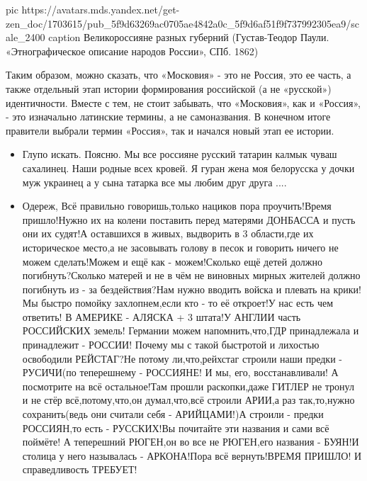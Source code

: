 
\ifcmt
  pic https://avatars.mds.yandex.net/get-zen_doc/1703615/pub_5f9d63269ac0705ae4842a0c_5f9d6af51f9f737992305ea9/scale_2400
  caption Великороссияне разных губерний (Густав-Теодор Паули. «Этнографическое описание народов России», СПб. 1862)
\fi

Таким образом, можно сказать, что «Московия» - это не Россия, это ее часть, а
также отдельный этап истории формирования российской (а не «русской»)
идентичности. Вместе с тем, не стоит забывать, что «Московия», как и «Россия»,
- это изначально латинские термины, а не самоназвания. В конечном итоге
правители выбрали термин «Россия», так и начался новый этап ее истории.

\begin{itemize}
\item {}

Глупо искать. Поясню. Мы все россияне русский татарин калмык чуваш сахалинец.
Наши родные всех кровей. Я гуран жена моя белорусска у дочки
муж украинец а у сына татарка все мы любим друг друга ....

\item {}

Одереж, Всё правильно говоришь,только нациков пора проучить!Время пришло!Нужно их на колени поставить перед матерями ДОНБАССА и пусть они их судят!А оставшихся в живых, выдворить в 3 области,где их историческое место,а не засовывать голову в песок и говорить ничего не можем сделать!Можем и ещё как - можем!Сколько ещё детей должно погибнуть?Сколько матерей и не в чём не виновных мирных жителей должно погибнуть из - за бездействия?Нам нужно вводить войска и плевать на крики! Мы быстро помойку захлопнем,если кто - то её откроет!У нас есть чем ответить! В АМЕРИКЕ - АЛЯСКА + 3 штата!У АНГЛИИ часть РОССИЙСКИХ земель! Германии можем напомнить,что,ГДР принадлежала и принадлежит - РОССИИ! Почему мы с такой быстротой и лихостью освободили РЕЙСТАГ?Не потому ли,что,рейхстаг строили наши предки - РУСИЧИ(по теперешнему - РОССИЯНЕ! И мы, его, восстанавливали! А посмотрите на всё остальное!Там прошли раскопки,даже ГИТЛЕР не тронул и не стёр всё,потому,что,он думал,что,всё строили АРИИ,а раз так,то,нужно сохранить(ведь они считали себя - АРИЙЦАМИ!)А строили - предки РОССИЯН,то есть - РУССКИХ!Вы почитайте эти названия и сами всё поймёте! А теперешний РЮГЕН,он во все не РЮГЕН,его названия - БУЯН!И столица у него называлась - АРКОНА!Пора всё вернуть!ВРЕМЯ ПРИШЛО! И справедливость ТРЕБУЕТ!


\end{itemize}
